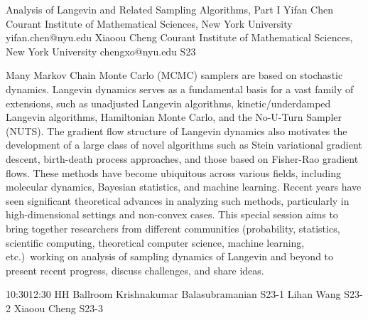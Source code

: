 \documentclass[12pt,lettersize,oneside]{book} %
\begin{document}
\begin{session}
 {Analysis of Langevin and Related Sampling Algorithms, Part I}%
 {Yifan Chen}%
 {Courant Institute of Mathematical Sciences, New York University}%
 {yifan.chen@nyu.edu}%
 {Xiaoou Cheng}%
 {Courant Institute of Mathematical Sciences, New York University}%
 {chengxo@nyu.edu}%
 {S23}%
 {}%

 {}
 Many Markov Chain Monte Carlo (MCMC) samplers are based on stochastic dynamics. Langevin dynamics serves as a fundamental basis for a vast family of extensions, such as unadjusted Langevin algorithms, kinetic/underdamped Langevin algorithms, Hamiltonian Monte Carlo, and the No-U-Turn Sampler (NUTS). The gradient flow structure of Langevin dynamics also motivates the development of a large class of novel algorithms such as Stein variational gradient descent, birth-death process approaches, and those based on Fisher-Rao gradient flows. These methods have become ubiquitous across various fields, including molecular dynamics, Bayesian statistics, and machine learning. Recent years have seen significant theoretical advances in analyzing such methods, particularly in high-dimensional settings and non-convex cases. This special session aims to bring together researchers from different communities (probability, statistics, scientific computing, theoretical computer science, machine learning, etc.)\ working on analysis of sampling dynamics of Langevin and beyond to present recent progress, discuss challenges, and share ideas.
\end{session}



\sessionPart{}%
{\hfill{}
{10:30}{12:30} %
{HH Ballroom}} %
{Krishnakumar Balasubramanian}
{S23-1}
{Lihan Wang}
{S23-2}
{Xiaoou Cheng}
{S23-3}
\end{document}
